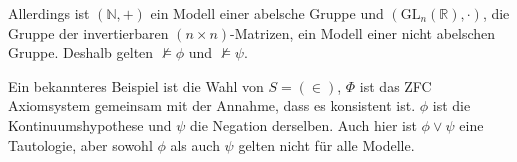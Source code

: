 \documentclass{article}
\theoremstyle{definition}
\theoremstyle{plain}
\theoremstyle{remark}
\begin{document}
Allerdings ist $(\mathbb{N},+)$ ein Modell einer abelsche Gruppe und $(\mathrm{GL}_n(\mathbb{R}),\cdot)$, die Gruppe der invertierbaren $(n\times n)$-Matrizen, ein Modell einer nicht abelschen Gruppe. Deshalb gelten $\nvDash \phi$ und $\nvDash \psi$. \smallskip

Ein bekannteres Beispiel ist die Wahl von $S=(\in)$, $\Phi$ ist das ZFC Axiomsystem gemeinsam mit der Annahme, dass es konsistent ist. $\phi$ ist die Kontinuumshypothese und $\psi$ die Negation derselben. Auch hier ist $\phi\vee\psi$ eine Tautologie, aber sowohl $\phi$ als auch $\psi$ gelten nicht für alle Modelle.
\end{document}
